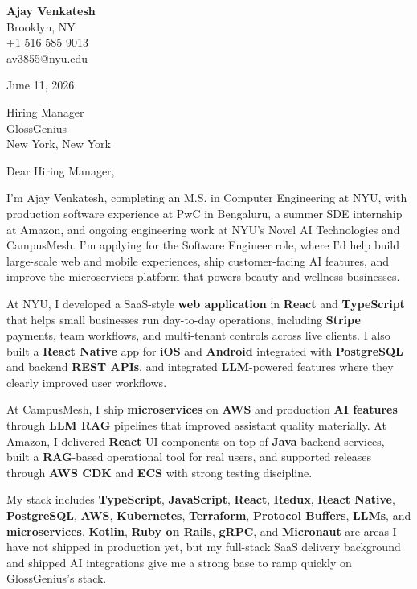\documentclass[letterpaper,11pt]{article}
\begin{document}
\begin{flushleft}
\textbf{\large Ajay Venkatesh} \\
Brooklyn, NY \\
+1 516 585 9013 \\
\href{mailto:av3855@nyu.edu}{av3855@nyu.edu}
\end{flushleft}
\vspace{10pt}
June 11, 2026
\vspace{6pt}

Hiring Manager \\
GlossGenius \\
New York, New York

\vspace{10pt}

Dear Hiring Manager,

I'm Ajay Venkatesh, completing an M.S. in Computer Engineering at NYU, with production software experience at PwC in Bengaluru, a summer SDE internship at Amazon, and ongoing engineering work at NYU's Novel AI Technologies and CampusMesh. I'm applying for the Software Engineer role, where I'd help build large-scale web and mobile experiences, ship customer-facing AI features, and improve the microservices platform that powers beauty and wellness businesses.

At NYU, I developed a SaaS-style \textbf{web application} in \textbf{React} and \textbf{TypeScript} that helps small businesses run day-to-day operations, including \textbf{Stripe} payments, team workflows, and multi-tenant controls across live clients. I also built a \textbf{React Native} app for \textbf{iOS} and \textbf{Android} integrated with \textbf{PostgreSQL} and backend \textbf{REST APIs}, and integrated \textbf{LLM}-powered features where they clearly improved user workflows.

At CampusMesh, I ship \textbf{microservices} on \textbf{AWS} and production \textbf{AI features} through \textbf{LLM RAG} pipelines that improved assistant quality materially. At Amazon, I delivered \textbf{React} UI components on top of \textbf{Java} backend services, built a \textbf{RAG}-based operational tool for real users, and supported releases through \textbf{AWS CDK} and \textbf{ECS} with strong testing discipline.

My stack includes \textbf{TypeScript}, \textbf{JavaScript}, \textbf{React}, \textbf{Redux}, \textbf{React Native}, \textbf{PostgreSQL}, \textbf{AWS}, \textbf{Kubernetes}, \textbf{Terraform}, \textbf{Protocol Buffers}, \textbf{LLMs}, and \textbf{microservices}. \textbf{Kotlin}, \textbf{Ruby on Rails}, \textbf{gRPC}, and \textbf{Micronaut} are areas I have not shipped in production yet, but my full-stack SaaS delivery background and shipped AI integrations give me a strong base to ramp quickly on GlossGenius's stack.
\end{document}
